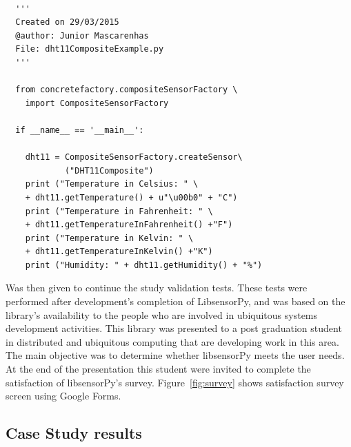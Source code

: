 \documentclass{acm_proc_article-sp}
\begin{document}
\renewcommand{\theFancyVerbLine}{
  \sffamily\textcolor[rgb]{0.5,0.5,0.5}{\scriptsize\arabic{FancyVerbLine}}}
\begin{verbatim}

  '''
  Created on 29/03/2015
  @author: Junior Mascarenhas
  File: dht11CompositeExample.py
  '''
  
  from concretefactory.compositeSensorFactory \
  	import CompositeSensorFactory

  if __name__ == '__main__':

    dht11 = CompositeSensorFactory.createSensor\
    	    ("DHT11Composite")
    print ("Temperature in Celsius: " \
    + dht11.getTemperature() + u"\u00b0" + "C")
    print ("Temperature in Fahrenheit: " \
    + dht11.getTemperatureInFahrenheit() +"F")
    print ("Temperature in Kelvin: " \
    + dht11.getTemperatureInKelvin() +"K")
    print ("Humidity: " + dht11.getHumidity() + "%")
\end{verbatim}
Was then given to continue the study validation tests. These tests were performed after development's completion of LibsensorPy, and was based on the library's availability to the people who are involved in ubiquitous systems development activities.
\newline
\newline
This library was presented to a post graduation student in distributed and ubiquitous computing that are developing work in this area. The main objective was to determine whether libsensorPy meets the user needs.
\newline
\newline
At the end of the presentation this student were invited to complete the satisfaction of libsensorPy's survey. Figure~\ref{fig:survey} shows satisfaction survey screen using Google Forms.


\subsection{Case Study results}
\end{document}
